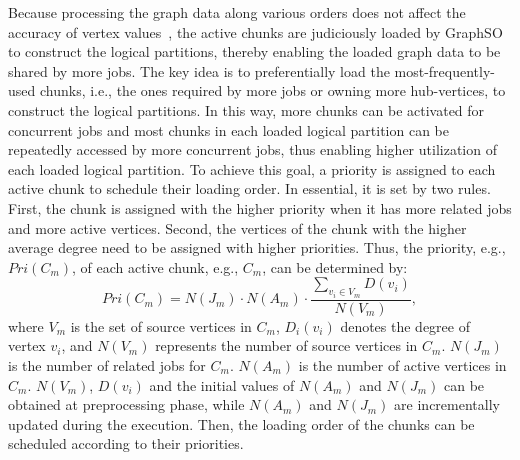 \documentclass[10pt,journal,compsoc]{IEEEtran}
\begin{document}
Because processing the graph data along various orders does not affect the accuracy of vertex values~\cite{Maiter,HotGraph,Wonderland}, the active chunks are judiciously loaded by GraphSO to construct the logical partitions, thereby enabling the loaded graph data to be shared by more jobs.
The key idea is to preferentially load the most-frequently-used chunks, i.e., the ones required by more jobs or owning more hub-vertices, to construct the logical partitions.
In this way, more chunks can be activated for concurrent jobs and most chunks in each loaded logical partition can be repeatedly accessed by more concurrent jobs, thus enabling higher utilization of each loaded logical partition.
To achieve this goal, a priority is assigned to each active chunk to schedule their loading order.
In essential, it is set by two rules. First, the chunk is assigned with the higher priority when it has more related jobs and more active vertices.
Second, the vertices of the chunk with the higher average degree need to be assigned with higher priorities.
Thus, the priority, e.g., $Pri(C_m)$, of each active chunk, e.g., $C_m$, can be determined by:
\vspace{-5pt}
\begin{equation}
\label{eq:priority}
	Pri(C_m) =  N(J_m) \cdot N(A_m) \cdot \frac{\sum_{v_i \in V_m} D(v_i)}{N(V_m)} ,
\end{equation}
where $V_m$ is the set of source vertices in $C_m$, $D_i(v_i)$ denotes the degree of vertex $v_i$, and $N(V_m)$ represents the number of source vertices in $C_m$.  $N(J_m)$ is the number of related jobs for $C_m$. $N(A_m)$ is the number of active vertices in $C_m$.
$N(V_m)$, $D(v_i)$ and the initial values of $N(A_m)$ and $N(J_m)$ can be obtained at preprocessing phase, while $N(A_m)$ and $N(J_m)$ are incrementally updated during the execution. Then, the loading order of the chunks can be scheduled according to their priorities.
\end{document}
